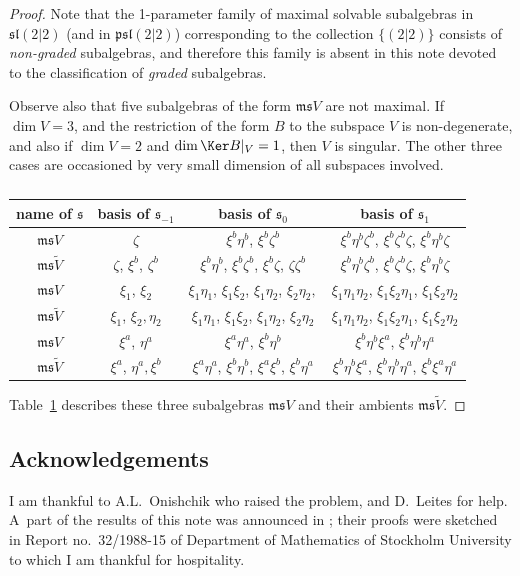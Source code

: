 \documentclass[pdftex]{sigma}
\newcommand {\fm} {{\mathfrak{m}}}
\newcommand {\fp} {{\mathfrak{p}}} %
\newcommand {\fs} {{\mathfrak{s}}}
\newcommand {\fsl} {{\mathfrak{sl}}}
\newcommand {\<} [2] {{\left.\vphantom{#2}\right.^{#1\!}\!{#2}}}
\numberwithin{equation}{section}
\begin{document}
\begin{proof}
Note that the 1-parameter family of maximal solvable subalgebras in $\fsl(2|2)$ (and in $\fp\fsl(2|2)$) corresponding to the collection $\{(2|2)\}$ consists of \textit{non-graded} subalgebras, and therefore this family is absent in this note devoted to the classification of
\textit{graded} subalgebras.

Observe also that five subalgebras of the form $\fm\fs V$ are not maximal. If $\dim V=3$, and the restriction of the form $B$ to the subspace $V$ is non-degenerate, and also if $\dim V=2$ and $\dim \Ker B|_V=1$, then $V$ is singular. The other three cases are occasioned by very small dimension of all subspaces involved.
\begin{table}[h]\centering\renewcommand{\arraystretch}{1.2}
\begin{tabular}{|c|c|c|c|}
\hline
name of $\fs$ & basis of $\fs_{-1}$ & basis of $\fs_0$ & basis of $\fs_1$\\
\hline
$\fm\fs V$ & $\zeta $ & $\xi^b\eta^b$, $\xi^b\zeta^b$ & $\xi^b\eta^b\zeta^b$, $\xi^b\zeta^b\zeta$, $\xi^b\eta^b\zeta$ \\
\hline
$\fm\fs \widetilde V$ & $\zeta$, $\xi^b$, $\zeta^b $ & $\xi^b\eta^b$, $\xi^b\zeta^b$, $\xi^b\zeta$, $\zeta\zeta^b$ & $\xi^b\eta^b\zeta^b$, $\xi^b\zeta^b\zeta$, $\xi^b\eta^b\zeta$ \\
\hline\hline
$\fm\fs V$ & $\xi_1$, $\xi_2$ & $\xi_1\eta_1$, $\xi_1\xi_2$, $\xi_1\eta_2$, $\xi_2\eta_2,$ & $\xi_1\eta_1\eta_2$, $\xi_1\xi_2\eta_1$, $\xi_1\xi_2\eta_2$ \\
\hline
$\fm\fs\widetilde V$ & $\xi_1$, $\xi_2,\eta_2 $ & $\xi_1\eta_1$, $\xi_1\xi_2$, $\xi_1\eta_2$, $\xi_2\eta_2$ & $\xi_1\eta_1\eta_2$, $\xi_1\xi_2\eta_1$, $\xi_1\xi_2\eta_2$ \\
\hline\hline
$\fm\fs V$ & $\xi^a$, $\eta^a$ & $\xi^a\eta^a$, $\xi^b\eta^b$ & $\xi^b\eta^b\xi^a$, $\xi^b\eta^b\eta^a$ \\
\hline
$\fm\fs\widetilde V$ & $\xi^a$, $\eta^a,\xi^b$ & $\xi^a\eta^a$, $\xi^b\eta^b$, $\xi^a\xi^b$, $\xi^b\eta^a$ & $\xi^b\eta^b\xi^a$, $\xi^b\eta^b\eta^a$, $\xi^b\xi^a\eta^a$ \\
\hline\hline
\end{tabular}
\caption{}\label{5sub}
\end{table}

Table~\ref{5sub} describes these three subalgebras
$\fm\fs V$ and their ambients $\fm\fs \widetilde V$.
\end{proof}

\subsection*{Acknowledgements}
I am thankful to A.L.~Oni\-shchik who raised the problem, and D.~Leites for help. A~part of the results of this note was announced in \cite{S1}; their proofs were sketched in Report no.~32/1988-15 of Department of Mathematics of Stockholm University to which I am thankful for hospitality.
\end{document}
